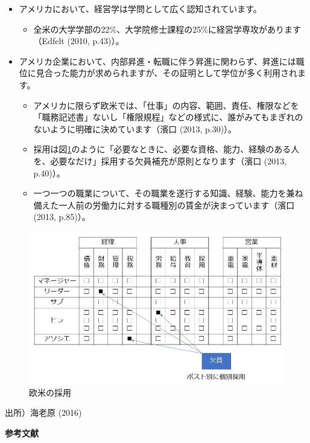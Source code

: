 \documentclass[
]{book}
\providecommand{\tightlist}{%
  \setlength{\itemsep}{0pt}\setlength{\parskip}{0pt}}
\begin{document}
\begin{itemize}
\item
  アメリカにおいて、経営学は学問として広く認知されています。

  \begin{itemize}
  \tightlist
  \item
    全米の大学学部の22\%、大学院修士課程の25\%に経営学専攻があります（Edfelt (2010, p.43)）。
  \end{itemize}
\item
  アメリカ企業において、内部昇進・転職に伴う昇進に関わらず、昇進には職位に見合った能力が求められますが、その証明として学位が多く利用されます。

  \begin{itemize}
  \item
    アメリカに限らず欧米では、「仕事」の内容、範囲、責任、権限などを「職務記述書」ないし「権限規程」などの様式に、誰がみてもまぎれのないように明確に決めています（濱口 (2013, p.30)）。
  \item
    採用は図\ref{fig:uspost}のように「必要なときに、必要な資格、能力、経験のある人を、必要なだけ」採用する欠員補充が原則となります（濱口 (2013, p.40)）。
  \item
    一つ一つの職業について、その職業を遂行する知識、経験、能力を兼ね備えた一人前の労働力に対する職種別の賃金が決まっています（濱口 (2013, p.85)）。
  \end{itemize}
\end{itemize}

\begin{figure}
\includegraphics[width=960px]{uspost} \caption{欧米の採用}\label{fig:uspost}
\end{figure}

出所）海老原 (2016)

{\textbf{参考文献}}
\end{document}
